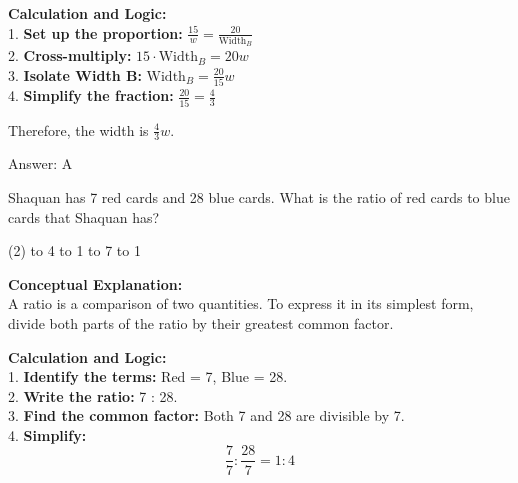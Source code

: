 \documentclass[11pt,paper=a4,answers]{exam}
\begin{document}
\begin{questions}
\begin{solution}
\begin{center}
\end{center}
\vspace{20pt}

\textbf{Calculation and Logic:} \\
1. \textbf{Set up the proportion:} $\frac{15}{w} = \frac{20}{\text{Width}_B}$ \\
2. \textbf{Cross-multiply:} $15 \cdot \text{Width}_B = 20w$ \\
3. \textbf{Isolate Width B:} $\text{Width}_B = \frac{20}{15}w$ \\
4. \textbf{Simplify the fraction:} $\frac{20}{15} = \frac{4}{3}$

\vspace{15pt}

Therefore, the width is $\frac{4}{3}w$.

\vspace{30pt}

Answer: \colorbox{yellow!100}{A}
\end{solution}

\vspace{60pt}

\question
Shaquan has 7 red cards and 28 blue cards. What is the ratio of red cards to blue cards that Shaquan has?
\begin{tasks}(2)
     to 4
     to 1
     to 7
     to 1
\end{tasks}

\begin{solution}
\textbf{Conceptual Explanation:} \\
A ratio is a comparison of two quantities. To express it in its simplest form, divide both parts of the ratio by their greatest common factor.

\vspace{30pt}

\textbf{Calculation and Logic:} \\
1. \textbf{Identify the terms:} Red = 7, Blue = 28. \\
2. \textbf{Write the ratio:} 7 : 28. \\
3. \textbf{Find the common factor:} Both 7 and 28 are divisible by 7. \\
4. \textbf{Simplify:} 
\[ \frac{7}{7} : \frac{28}{7} = 1 : 4 \]


\end{solution}
\end{questions}
\end{document}

